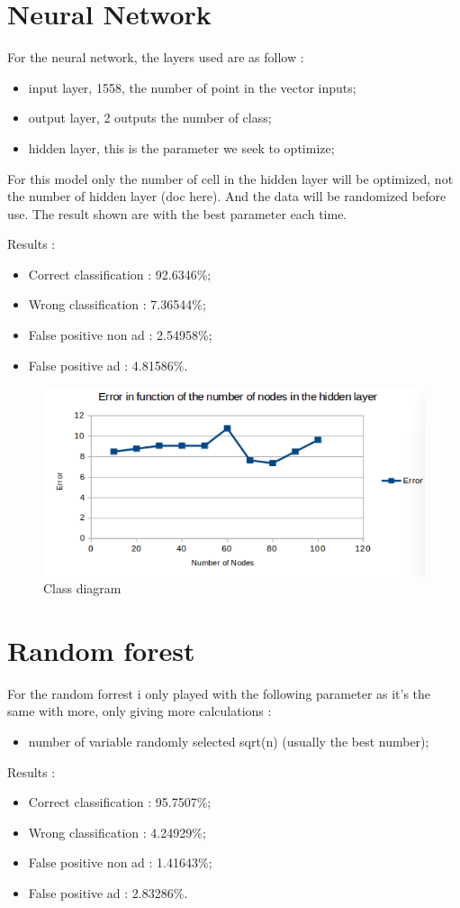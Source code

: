 \section{Neural Network}
For the neural network, the layers used are as follow :
  \begin{itemize}
    \item input layer, 1558, the number of point in the vector inputs;
    \item output layer, 2 outputs the number of class;
    \item hidden layer, this is the parameter we seek to optimize;
  \end{itemize}

 For this model only the number of cell in the hidden layer will be optimized, not the number of hidden layer (doc here). And the data will be randomized before use. The result shown are with the best parameter each time.

  Results :
  \begin{itemize}
    \item Correct classification : 92.6346\%;
    \item Wrong classification : 7.36544\%;
    \item False positive non ad : 2.54958\%;
    \item False positive ad : 4.81586\%.
  \end{itemize}

  \begin{figure}[h]
   \centering
   \includegraphics[scale=0.5]{../images/NNPO.png}
   \caption{Class diagram}
  \end{figure}

\section{Random forest}
For the random forrest i only played with the following parameter as it's the same with more, only giving more calculations :
  \begin{itemize}
    \item number of variable randomly selected sqrt(n) (usually the best number);
  \end{itemize}
Results :
\begin{itemize}
  \item Correct classification : 95.7507\%;
  \item Wrong classification : 4.24929\%;
  \item False positive non ad : 1.41643\%;
  \item False positive ad : 2.83286\%.
\end{itemize}


